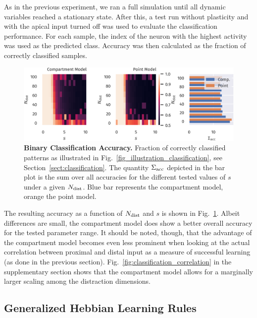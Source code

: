 \documentclass[utf8]{frontiersSCNS} %
\begin{document}
As in the previous experiment, we ran a full simulation until 
all dynamic variables reached a stationary state. After this,
a test run without plasticity and with the apical input turned off 
was used to evaluate the classification	performance. 
For each sample, the index of the neuron with the highest 
activity was used as the predicted class. 
Accuracy was then calculated as the fraction
of correctly classified samples.
\begin{figure}[t]
\centering
\includegraphics[width=1.0\columnwidth]{classification_dimension_scaling_high_input_dim}
\caption{{\bf Binary Classification Accuracy.}
	Fraction of correctly classified patterns as illustrated in
	Fig.~\ref{fig_illustration_classification}, see 
	Section~\ref{sect:classification}. The quantity $\Sigma_{\rm acc}$ depicted in the bar
	plot is the sum over all accuracies for the different tested values
	of $s$ under a given $N_{\rm dist}$. Blue bar represents the compartment model,
	orange the point model.}
\label{fig:classification_accuracy}
\end{figure}

The resulting accuracy as a function of $N_{\rm dist}$ and $s$
is shown in Fig.~\ref{fig:classification_accuracy}.
Albeit differences are small, the compartment model does
show a better overall accuracy for the tested parameter range.
It should be noted, though, that the advantage of the compartment
model becomes even less prominent when looking at the actual
correlation between proximal and distal input as a
measure of successful learning (as done in the previous section).
Fig.~\ref{fig:classification_correlation} in the supplementary 
section shows that the compartment model allows for a marginally
larger scaling among the distraction dimensions.
\\
\subsection{Generalized Hebbian Learning Rules}
\label{sect:non-hebbian}
\end{document}
